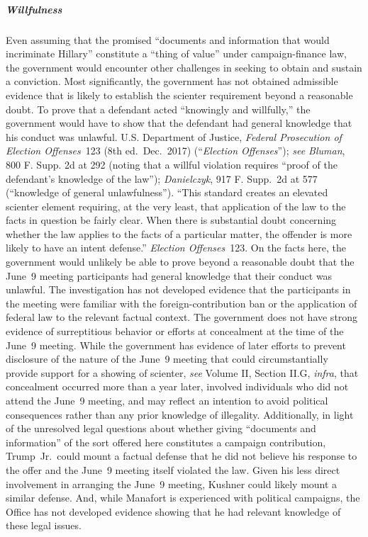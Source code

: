 \subparagraph{Willfulness}
Even assuming that the promised ``documents and information that would incriminate Hillary'' constitute a ``thing of value'' under campaign-finance law, the government would encounter other challenges in seeking to obtain and sustain a conviction.
Most significantly, the government has not obtained admissible evidence that is likely to establish the scienter requirement beyond a reasonable doubt.
To prove that a defendant acted ``knowingly and willfully,'' the government would have to show that the defendant had general knowledge that his conduct was unlawful.
U.S. Department of Justice, \textit{Federal Prosecution of Election Offenses}~123 (8th ed.\ Dec.~2017) (``\textit{Election Offenses}''); \textit{see Bluman}, 800 F. Supp. 2d at 292 (noting that a willful violation requires ``proof of the defendant's knowledge of the law''); \textit{Danielczyk}, 917 F. Supp.~2d at 577 (``knowledge of general unlawfulness'').
``This standard creates an elevated scienter element requiring, at the very least, that application of the law to the facts in question be fairly clear.
When there is substantial doubt concerning whether the law applies to the facts of a particular matter, the offender is more likely to have an intent defense.''
\textit{Election Offenses}~123.
On the facts here, the government would unlikely be able to prove beyond a reasonable doubt that the June~9 meeting participants had general knowledge that their conduct was unlawful.
The investigation has not developed evidence that the participants in the meeting were familiar with the foreign-contribution ban or the application of federal law to the relevant factual context.
The government does not have strong evidence of surreptitious behavior or efforts at concealment at the time of the June~9 meeting.
While the government has evidence of later efforts to prevent disclosure of the nature of the June~9 meeting that could circumstantially provide support for a showing of scienter, \textit{see} Volume II, Section II.G, \textit{infra}, that concealment occurred more than a year later, involved individuals who did not attend the June~9 meeting, and may reflect an intention to avoid political consequences rather than any prior knowledge of illegality.
Additionally, in light of the unresolved legal questions about whether giving ``documents and information'' of the sort offered here constitutes a campaign contribution, Trump~Jr.\ could mount a factual defense that he did not believe his response to the offer and the June~9 meeting itself violated the law.
Given his less direct involvement in arranging the June~9 meeting, Kushner could likely mount a similar defense.
And, while Manafort is experienced with political campaigns, the Office has not developed evidence showing that he had relevant knowledge of these legal issues.

